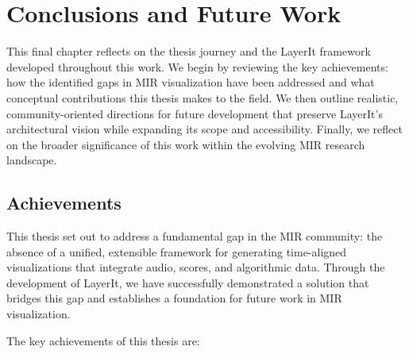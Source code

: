 \chapter{Conclusions and Future Work} \label{chap:concl}
This final chapter reflects on the thesis journey and the LayerIt framework developed throughout this work. We begin by reviewing the key achievements: how the identified gaps in MIR visualization have been addressed and what conceptual contributions this thesis makes to the field. We then outline realistic, community-oriented directions for future development that preserve LayerIt's architectural vision while expanding its scope and accessibility. Finally, we reflect on the broader significance of this work within the evolving MIR research landscape.

\section{Achievements}

This thesis set out to address a fundamental gap in the MIR community: the absence of a unified, extensible framework for generating time-aligned visualizations that integrate audio, scores, and algorithmic data. Through the development of LayerIt, we have successfully demonstrated a solution that bridges this gap and establishes a foundation for future work in MIR visualization.

The key achievements of this thesis are:

